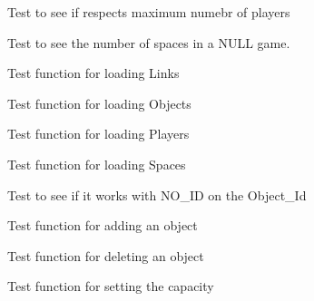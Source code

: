 \begin{DoxyRefList}
\item[\label{test__test000060}%
\hypertarget{test__test000060}{}%
Member \hyperlink{game__test_8h_a0147e621a4267900f75e271170104872}{test4\+\_\+game\+\_\+get\+\_\+players\+\_\+number} ()]Test to see if respects maximum numebr of players  
\item[\label{test__test000056}%
\hypertarget{test__test000056}{}%
Member \hyperlink{game__test_8h_ae33709bf82f1ddc9b8a06176c97de56c}{test4\+\_\+game\+\_\+get\+\_\+spaces\+\_\+number} ()]Test to see the number of spaces in a N\+U\+LL game.  
\item[\label{test__test000026}%
\hypertarget{test__test000026}{}%
Member \hyperlink{game__reader__test_8h_aeee71f446359d645ab55feb5ee3d1291}{test4\+\_\+game\+\_\+reader\+\_\+load\+\_\+links} ()]Test function for loading Links  
\item[\label{test__test000022}%
\hypertarget{test__test000022}{}%
Member \hyperlink{game__reader__test_8h_a91872c66040f1ad26db8460f0fe8f674}{test4\+\_\+game\+\_\+reader\+\_\+load\+\_\+objects} ()]Test function for loading Objects  
\item[\label{test__test000018}%
\hypertarget{test__test000018}{}%
Member \hyperlink{game__reader__test_8h_ad45fc025710a90611074500625956c3e}{test4\+\_\+game\+\_\+reader\+\_\+load\+\_\+players} ()]Test function for loading Players  
\item[\label{test__test000014}%
\hypertarget{test__test000014}{}%
Member \hyperlink{game__reader__test_8h_af1ab6d8dc2c73b7f4902c12652e48ac6}{test4\+\_\+game\+\_\+reader\+\_\+load\+\_\+spaces} ()]Test function for loading Spaces  
\item[\label{test__test000076}%
\hypertarget{test__test000076}{}%
Member \hyperlink{game__test_8h_ac94ee201653d62006bc315592236ac90}{test4\+\_\+game\+\_\+set\+\_\+object\+\_\+location} ()]Test to see if it works with N\+O\+\_\+\+ID on the Object\+\_\+\+Id  
\item[\label{test__test000096}%
\hypertarget{test__test000096}{}%
Member \hyperlink{inventory__test_8h_afe091fc610e1df3c1d0982754ea1ae7f}{test4\+\_\+inventory\+\_\+add} ()]Test function for adding an object  
\item[\label{test__test000100}%
\hypertarget{test__test000100}{}%
Member \hyperlink{inventory__test_8h_a8df246f77e3ca2cdaf6162bd88eda9ef}{test4\+\_\+inventory\+\_\+del} ()]Test function for deleting an object  
\item[\label{test__test000104}%
\hypertarget{test__test000104}{}%
Member \hyperlink{inventory__test_8h_ad7af47985db2fe8d44d715df81414f33}{test4\+\_\+inventory\+\_\+set\+\_\+max\+\_\+objects} ()]Test function for setting the capacity  

\end{DoxyRefList}
